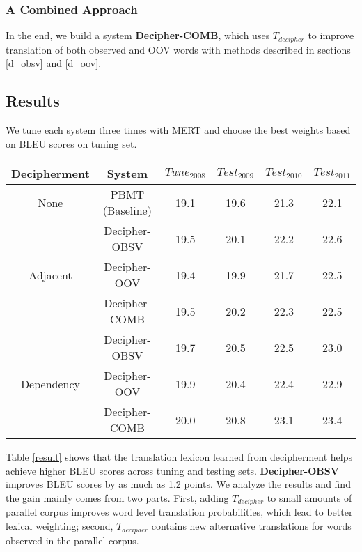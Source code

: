 \subsubsection{A Combined Approach}
In the end, we build a system \textbf{Decipher-COMB}, which uses $T_{decipher}$ to improve translation of both observed and OOV words with methods described in sections \ref{d_obsv} and \ref{d_oov}.

\subsection{Results}
We tune each system three times with MERT and choose the best weights based on BLEU scores on tuning set.


 \begin{table*}[th]
 \begin{center}
 \begin{tabular}{ |c|c|c|c|c|c| } \hline
 Decipherment & System & $Tune_{2008}$ & $Test_{2009}$ & $Test_{2010}$ & $Test_{2011}$ \\ \hline
 None & PBMT (Baseline) &  19.1 & 19.6 & 21.3 & 22.1 \\ \hline \hline
   \multirow{3}{*}{Adjacent} & Decipher-OBSV &  19.5 & 20.1 & 22.2 & 22.6 \\ \hhline{~-----}
 &Decipher-OOV &  19.4 & 19.9& 21.7 & 22.5\\ \hhline{~-----}
 &Decipher-COMB &  19.5 & 20.2 & 22.3 & 22.5 \\ \hline \hline

  \multirow{3}{*}{Dependency} & Decipher-OBSV &19.7  & 20.5  & 22.5  & 23.0 \\ \hhline{~-----}
 & Decipher-OOV &  19.9  & 20.4 & 22.4  & 22.9 \\ \hhline{~-----}
 & Decipher-COMB &  20.0 & 20.8  & 23.1 & 23.4 \\ \hline


 \end{tabular}
 \caption{Systems that use translation lexicons learned from decipherment show consistent improvement over the baseline system across tuning and testing sets. The best system, Decipher-COMB, achieves as much as 1.8 BLEU point gain on the 2010 news test set.}
 \label{result}
 \end{center}
 \end{table*}

Table \ref{result} shows that the translation lexicon learned from decipherment helps achieve higher BLEU scores across tuning and testing sets. \textbf{Decipher-OBSV} improves BLEU scores by as much as 1.2 points. We analyze the results and find the gain mainly comes from two parts. First, adding $T_{decipher}$ to small amounts of parallel corpus improves word level translation probabilities, which lead to better lexical weighting; second, $T_{decipher}$ contains new alternative translations for words observed in the parallel corpus.


